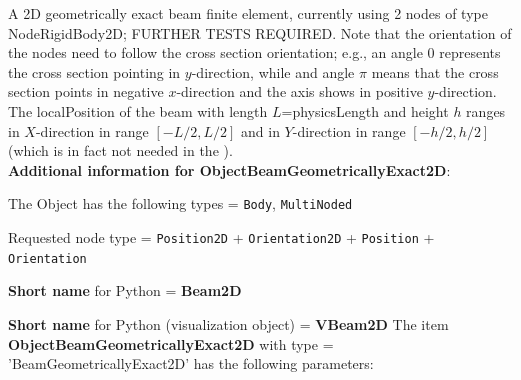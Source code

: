 \label{sec:item:ObjectBeamGeometricallyExact2D}
A 2D geometrically exact beam finite element, currently using 2 nodes of type NodeRigidBody2D; FURTHER TESTS REQUIRED. Note that the orientation of the nodes need to follow the cross section orientation; e.g., an angle 0 represents the cross section pointing in $y$-direction, while and angle $\pi$ means that the cross section points in negative $x$-direction and the axis shows in positive $y$-direction. The localPosition of the beam with length $L$=physicsLength and height $h$ ranges in $X$-direction in range $[-L/2, L/2]$ and in $Y$-direction in range $[-h/2,h/2]$ (which is in fact not needed in the ).\vspace{12pt}
 \\{\bf Additional information for ObjectBeamGeometricallyExact2D}:
\bi
  \item The Object has the following types = \texttt{Body}, \texttt{MultiNoded}
  \item Requested node type = \texttt{Position2D} + \texttt{Orientation2D} + \texttt{Position} + \texttt{Orientation}
  \item {\bf Short name} for Python = {\bf Beam2D}  \item {\bf Short name} for Python (visualization object) = {\bf VBeam2D}\ei
\vspace{12pt} \noindent The item {\bf ObjectBeamGeometricallyExact2D} with type = 'BeamGeometricallyExact2D' has the following parameters:\vspace{-1cm}\\ 
